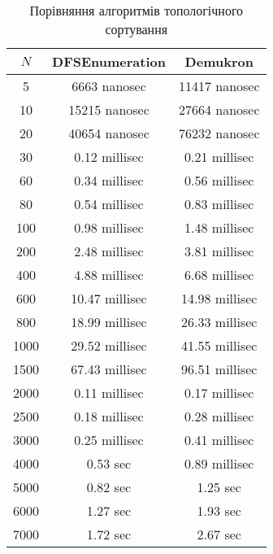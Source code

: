 \documentclass{article}
\begin{document}
\begin{table}[h]
\centering
\begin{tabular}{|c|c|c|}
\hline
\(N\) & DFSEnumeration & Demukron  \\
\hline
5 & 6663 nanosec & 11417 nanosec \\
10 & 15215 nanosec & 27664 nanosec \\
20 & 40654 nanosec & 76232 nanosec \\
30 & 0.12 millisec & 0.21 millisec \\
60 & 0.34 millisec & 0.56 millisec \\
80 & 0.54 millisec & 0.83 millisec \\
100 & 0.98 millisec & 1.48 millisec \\
200 & 2.48 millisec & 3.81 millisec \\
400 & 4.88 millisec & 6.68 millisec \\
600 & 10.47 millisec & 14.98 millisec \\
800 & 18.99 millisec & 26.33 millisec \\
1000 & 29.52 millisec & 41.55 millisec \\
1500 & 67.43 millisec & 96.51 millisec \\
2000 & 0.11 millisec & 0.17 millisec \\
2500 & 0.18 millisec & 0.28 millisec \\
3000 & 0.25 millisec & 0.41 millisec \\
4000 & 0.53 sec & 0.89 millisec \\
5000 & 0.82 sec & 1.25 sec \\
6000 & 1.27 sec & 1.93 sec \\
7000 & 1.72 sec & 2.67 sec \\

\hline
\end{tabular}
\caption{Порівняння алгоритмів топологічного сортування}
\label{tab:comparison}
\end{table}



\end{document}

